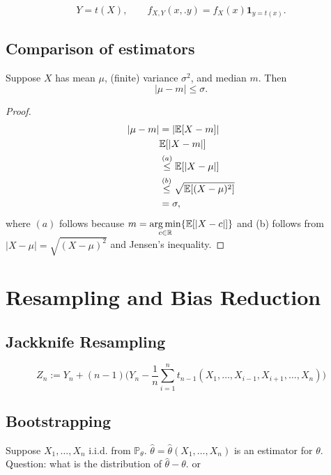 \begin{remark}

\[
Y = t(X), \qquad f_{X,Y}(x,.y) = f_X(x) \boldsymbol{1}_{y=t(x)}.
\]

\end{remark}

\subsection{Comparison of estimators}

\begin{proposition}
Suppose \(X\) has mean \(\mu\), (finite) variance \(\sigma^2\), and median \(m\). Then
\[
| \mu - m | \leq \sigma.
\]
\end{proposition}

\begin{proof}
\begin{align*}
|\mu - m| & = | \E[X - m] |
\\ &  \E[ |X - m| ]
\\ &  \stackrel{(a)}{\leq}  \E [ |X - \mu | ]
\\ & \stackrel{(b)}{\leq}  \sqrt{ \E [ (X - \mu)^2]}
\\ & = \sigma,
\end{align*}
where \((a)\) follows because \(m = \underset{c \in \mathbb{R}}{\arg \min} \{\E [ | X - c| ]\}\) and (b) follows from \(|X - \mu| = \sqrt{(X - \mu)^2}\) and Jensen's inequality.
\end{proof}

\section{Resampling and Bias Reduction}

\subsection{Jackknife Resampling}

\[
Z_n :=  Y_n + (n-1) \bigg(Y_n - \frac{1}{n} \sum_{i=1}^n t_{n-1}(X_1, \ldots, X_{i-1}, X_{i+1}, \ldots, X_n) \bigg) 
\]

\subsection{Bootstrapping}

Suppose \(X_1, \ldots, X_n\) i.i.d. from \(\mathbb{P}_\theta\). \(\hat{\theta} = \hat{\theta}(X_1, \ldots, X_n)\) is an estimator for \(\theta\). Question: what is the distribution of \(\hat{\theta} - \theta\). or 

